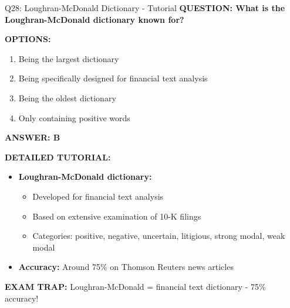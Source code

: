 \documentclass[8pt]{beamer}
\begin{document}
	\begin{frame}{Q28: Loughran-McDonald Dictionary - Tutorial}
		\fontsize{6.5}{7.5}\selectfont
		\textbf{QUESTION: What is the Loughran-McDonald dictionary known for?}
		
		\vspace{0.1cm}
		\textbf{OPTIONS:}
		\begin{enumerate}
			\item Being the largest dictionary
			\item Being specifically designed for financial text analysis
			\item Being the oldest dictionary
			\item Only containing positive words
		\end{enumerate}
		
		\vspace{0.1cm}
		\textcolor{myblue}{\textbf{ANSWER: B}}
		
		\vspace{0.1cm}
		\textbf{DETAILED TUTORIAL:}
		\begin{itemize}
			\item \textbf{Loughran-McDonald dictionary:}
			\begin{itemize}
				\item Developed for financial text analysis
				\item Based on extensive examination of 10-K filings
				\item Categories: positive, negative, uncertain, litigious, strong modal, weak modal
			\end{itemize}
			\item \textbf{Accuracy:} Around 75\% on Thomson Reuters news articles
		\end{itemize}
		
		\textcolor{myred}{\textbf{EXAM TRAP:}} Loughran-McDonald = \textcolor{myblue}{financial text dictionary} - 75\% accuracy!
	\end{frame}
	
\end{document}
